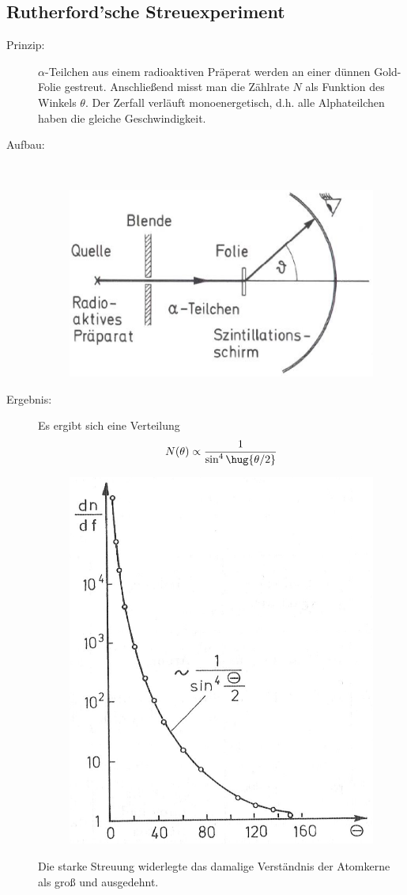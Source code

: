 \documentclass[twocolumn]{summery_4.1}
\begin{document}
\subsection{Rutherford'sche Streuexperiment}
\begin{description}
    \item[Prinzip:] \(\alpha\)-Teilchen aus einem radioaktiven Präperat werden an einer dünnen Gold-Folie gestreut. Anschließend misst man die Zählrate \(N\) als Funktion des Winkels \(\theta\). Der Zerfall verläuft monoenergetisch, d.h. alle Alphateilchen haben die gleiche Geschwindigkeit.
    \item[Aufbau:] \,
    \begin{figure}[H]
        \centering
        \includegraphics[width=.49\textwidth]{Rutherford_Aufbau.png}
    \end{figure}
    \item[Ergebnis:]
    Es ergibt sich eine Verteilung 
    \begin{align*}
        N(\theta) \propto \frac{1}{\sin^4\hug{\theta/2}}
    \end{align*}
    \begin{figure}[H]
        \centering
        \includegraphics[width=.49\textwidth]{Rutherford_Graph.png}
    \end{figure} 
    Die starke Streuung widerlegte das damalige Verständnis der Atomkerne als groß und ausgedehnt.
\end{description}
\end{document}
